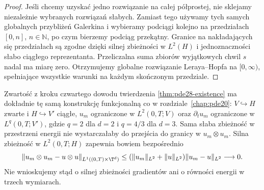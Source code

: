 \begin{proof}
Jeśli chcemy uzyskać jedno rozwiązanie na całej
półprostej, nie sklejamy niezależnie wybranych
rozwiązań słabych. Zamiast tego używamy tych samych
globalnych przybliżeń Galerkina i wybieramy
podciągi kolejno na przedziałach $[0,n]$,
$n\in\mathbb N$, po czym bierzemy podciąg
przekątny. Granice na nakładających się
przedziałach są zgodne dzięki silnej zbieżności
w $L^2(H)$ i jednoznaczności słabo ciągłego
reprezentanta. Przeliczalna suma zbiorów
wyjątkowych chwil $s$ nadal ma miarę zero.
Otrzymujemy globalne rozwiązanie Leraya--Hopfa
na $[0,\infty)$, spełniające wszystkie warunki
na każdym skończonym przedziale.
\end{proof}


\begin{uwaga}
\label{rem:pde-v44-ns-compactness}
Zwartość z kroku czwartego dowodu twierdzenia
\ref{thm:pde28-existence} ma dokładnie tę samą konstrukcję
funkcjonalną co w rozdziale~\ref{chap:pde20}:
$V\hookrightarrow H$ zwarte i $H\hookrightarrow V'$ ciągłe,
$u_m$ ograniczone w $L^2(0,T;V)$ oraz $\partial_tu_m$
ograniczone w $L^q(0,T;V')$, gdzie $q=2$ dla $d=2$
i $q=4/3$ dla $d=3$. Sama słaba zbieżność w przestrzeni
energii nie wystarczałaby do przejścia do granicy
w $u_m\otimes u_m$. Silna zbieżność w $L^2(0,T;H)$
zapewnia bowiem bezpośrednio
\[
 \|u_m\otimes u_m-u\otimes u\|_{L^1((0,T)\times\T^d)}
 \le (\|u_m\|_{L^2}+\|u\|_{L^2})\|u_m-u\|_{L^2}\longrightarrow0.
\]
Nie wnioskujemy stąd o silnej zbieżności gradientów ani
o równości energii w trzech wymiarach.
\end{uwaga}


